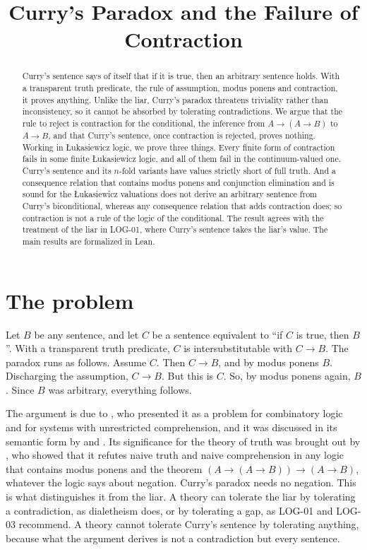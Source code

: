\documentclass{situationist-preprint}
\title{Curry's Paradox and the Failure of Contraction}
\begin{document}
\maketitle

\begin{abstract}
Curry's sentence says of itself that if it is true, then an arbitrary sentence holds. With a transparent truth predicate, the rule of assumption, modus ponens and contraction, it proves anything. Unlike the liar, Curry's paradox threatens triviality rather than inconsistency, so it cannot be absorbed by tolerating contradictions. We argue that the rule to reject is contraction for the conditional, the inference from $A \to (A \to B)$ to $A \to B$, and that Curry's sentence, once contraction is rejected, proves nothing. Working in Łukasiewicz logic, we prove three things. Every finite form of contraction fails in some finite Łukasiewicz logic, and all of them fail in the continuum-valued one. Curry's sentence and its $n$-fold variants have values strictly short of full truth. And a consequence relation that contains modus ponens and conjunction elimination and is sound for the Łukasiewicz valuations does not derive an arbitrary sentence from Curry's biconditional, whereas any consequence relation that adds contraction does; so contraction is not a rule of the logic of the conditional. The result agrees with the treatment of the liar in LOG-01, where Curry's sentence takes the liar's value. The main results are formalized in Lean.
\end{abstract}

\section{The problem}

Let $B$ be any sentence, and let $C$ be a sentence equivalent to \enquote{if $C$ is true, then $B$}. With a transparent truth predicate, $C$ is intersubstitutable with $C \to B$. The paradox runs as follows. Assume $C$. Then $C \to B$, and by modus ponens $B$. Discharging the assumption, $C \to B$. But this is $C$. So, by modus ponens again, $B$. Since $B$ was arbitrary, everything follows.

The argument is due to \citet{Curry1942}, who presented it as a problem for combinatory logic and for systems with unrestricted comprehension, and it was discussed in its semantic form by \citet{Geach1955} and \citet{Prior1955}. Its significance for the theory of truth was brought out by \citet{MeyerRoutleyDunn1979}, who showed that it refutes naive truth and naive comprehension in any logic that contains modus ponens and the theorem $(A \to (A \to B)) \to (A \to B)$, whatever the logic says about negation. Curry's paradox needs no negation. This is what distinguishes it from the liar. A theory can tolerate the liar by tolerating a contradiction, as dialetheism does, or by tolerating a gap, as LOG-01 and LOG-03 recommend. A theory cannot tolerate Curry's sentence by tolerating anything, because what the argument derives is not a contradiction but every sentence.
\end{document}
